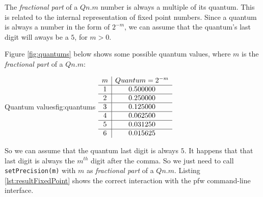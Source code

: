 The \emph{fractional part} of a $Qn.m$ number is always a multiple of its quantum. This is related to
the internal representation of fixed point numbers. Since a quantum is always a number in the form of $2^{-m}$, we can
assume that the quantum's last digit will aways be a $5$, for $m > 0$.

Figure \ref{fig:quantums} below shows some possible quantum values, where $m$ is the \emph{fractional part} of a $Qn.m$:

\begin{figureGraphics}{Quantum values}{fig:quantums}
    $
    \begin{array}{c|c}
        m & Quantum = 2^{-m} \\
        \hline
        1 & 0.500000 \\
        \hline
        2 & 0.250000 \\
        \hline
        3 & 0.125000 \\
        \hline
        4 & 0.062500 \\
        \hline
        5 & 0.031250 \\
        \hline
        6 & 0.015625
    \end{array}
    \vspace{0.3cm}
    $
\end{figureGraphics}

So we can assume that the quantum last digit is always $5$.
It happens that that last digit is always the $m^{th}$ digit after the comma.
So we just need to call \lstinline{setPrecision(m)} with $m$ as \emph{fractional part} of a $Qn.m$.
Listing \ref{lst:resultFixedPoint} shows the correct interaction with the \gls{pfw} command-line interface.


